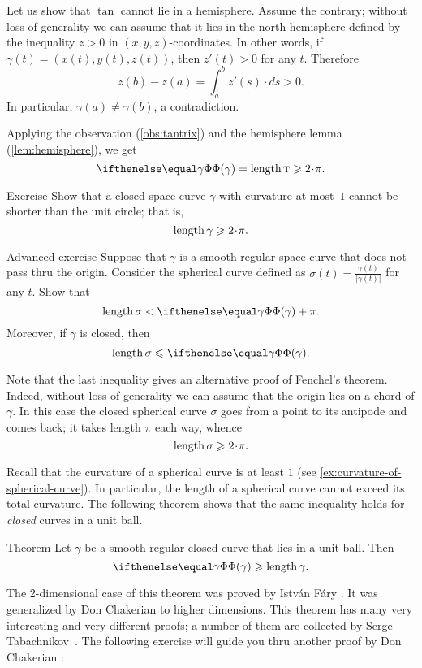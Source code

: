 Let us show that $\tan$ cannot lie in a hemisphere.
Assume the contrary; without loss of generality we can assume that it lies in the north hemisphere defined by the inequality $z>0$ in $(x,y,z)$-coordinates.
In other words, if $\gamma(t)=(x(t), y(t), z(t))$, then $z'(t)>0$ for any $t$.
Therefore 
\[z(b)-z(a)=\int_a^b z'(s)\cdot ds>0.\]
In particular, $\gamma(a)\ne \gamma(b)$, a contradiction.

Applying the observation (\ref{obs:tantrix}) and the hemisphere lemma (\ref{lem:hemisphere}), we get  
\[\tc\gamma=\length \tan\ge2\cdot\pi.\]
\qedsf

\begin{thm}{Exercise}\label{ex:length>=2pi}
Show that a closed space curve $\gamma$ with curvature at most~$1$ cannot be shorter than the unit circle;
that is, 
\[\length\gamma\ge 2\cdot \pi.\]

\end{thm}


\begin{thm}{Advanced exercise}\label{ex:gamma/|gamma|}
Suppose that $\gamma$ is a smooth regular space curve that does not pass thru the origin.
Consider the spherical curve defined as $\sigma(t)=\frac{\gamma(t)}{|\gamma(t)|}$ for any $t$.
Show that 
\[\length \sigma< \tc\gamma+\pi.\]
Moreover, if $\gamma$ is closed, then
\[\length \sigma\le \tc\gamma.\]
\end{thm}

Note that the last inequality gives an alternative proof of Fenchel's theorem.
Indeed, without loss of generality we can assume that the origin lies on a chord of $\gamma$.
In this case the closed spherical curve $\sigma$ goes from a point to its antipode and comes back; 
it takes length $\pi$ each way, 
whence 
\[\length\sigma\ge 2\cdot\pi.\]

Recall that the curvature of a spherical curve is at least $1$
(see \ref{ex:curvature-of-spherical-curve}).
In particular, the length of a spherical curve cannot exceed its total curvature.
The following theorem shows that the same inequality holds for {}\emph{closed} curves in a unit ball.

\begin{thm}{Theorem}\label{thm:DNA}
Let $\gamma$ be a smooth regular closed curve that lies in a unit ball.
Then 
\[\tc\gamma\ge \length\gamma.\]

\end{thm}

The 2-dimensional case of this theorem was proved by Istv\'{a}n F\'{a}ry \cite{fary1950}.
It was generalized by Don Chakerian \cite{chakerian1962} to higher dimensions.
This theorem has many very interesting and very different proofs;
a number of them are collected by Serge Tabachnikov~\cite{tabachnikov}.
The following exercise will guide you thru another proof by Don Chakerian \cite{chakerian1964}:

